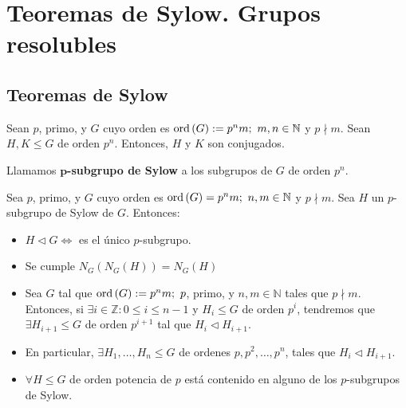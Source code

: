 \chapter{Teoremas de Sylow. Grupos\texorpdfstring{\\}{} resolubles}
\section{Teoremas de Sylow}
    \begin{theo}
        Sean $p$, primo, y $G$ cuyo orden es $\ord\left( G \right) := p^n m;\ m, n \in \mathbb{N}$ y $p \nmid m$. Sean $H, K \le G$ de orden $p^n$. Entonces, $H$ y $K$ son conjugados.
    \end{theo}

    \begin{defi}
        Llamamos \textbf{$\mathbf{p}$-subgrupo de Sylow} a los subgrupos de $G$ de orden $p^n$.
    \end{defi}

    \begin{coro}
        Sea $p$, primo, y $G$ cuyo orden es $\ord\left( G \right) = p^n m;\ n, m \in \mathbb{N}$ y $p \nmid m$. Sea $H$ un $p$-subgrupo de Sylow de $G$. Entonces:
        \begin{itemize}
        \item $H \triangleleft G \Leftrightarrow$ es el único $p$-subgrupo.
        \item Se cumple $N_G\left( N_G\left( H \right) \right) = N_G\left( H \right)$
        \end{itemize}
    \end{coro}

    \begin{theo}
        \begin{itemize}
        \item Sea $G$ tal que $\ord\left( G \right) := p^nm;\ p$, primo, y $n, m \in \mathbb{N}$ tales que $p \nmid m$. Entonces, si $\exists i \in \mathbb{Z}: 0 \le i \le n - 1$ y $H_i \le G$ de orden $p^i$, tendremos que $\exists H_{i+1} \le G$ de orden $p^{i+1}$ tal que $H_i \triangleleft H_{i+1}$.

        \item En particular, $\exists H_1, \ldots, H_{n} \le G$ de ordenes $p, p^2, \ldots, p^n$, tales que $H_i \triangleleft H_{i+1}$.

        \item $\forall H \le G$ de orden potencia de $p$ está contenido en alguno de los $p$-subgrupos de Sylow.
        \end{itemize}
    \end{theo}

